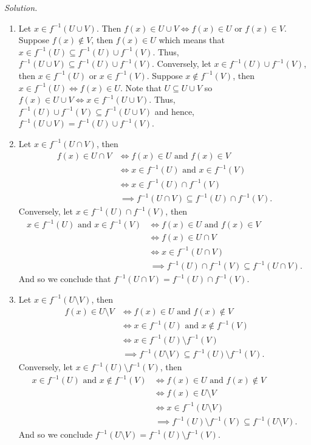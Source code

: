 \documentclass{amsart}
\theoremstyle{definition}
\begin{document}
\textit{Solution.} 
\begin{enumerate}
\item Let $x\in f^{-1}(U\cup V)$. Then $f(x)\in U\cup V \iff f(x)\in U$ or $f(x)\in V$. Suppose $f(x)\notin V$, then $f(x)\in U$ which means that $x\in f^{-1}(U)\subseteq f^{-1}(U)\cup f^{-1}(V)$. Thus, $f^{-1}(U\cup V)\subseteq f^{-1}(U)\cup f^{-1}(V)$. Conversely, let $x\in f^{-1}(U)\cup f^{-1}(V)$, then $x\in f^{-1}(U)$ or $x\in f^{-1}(V)$. Suppose $x\notin f^{-1}(V)$, then $x\in f^{-1}(U) \iff f(x)\in U$. Note that $U\subseteq U\cup V$ so $f(x)\in U\cup V\iff x\in f^{-1}(U\cup V)$. Thus, $f^{-1}(U)\cup f^{-1}(V)\subseteq f^{-1}(U\cup V)$ and hence, $f^{-1}(U\cup V)=f^{-1}(U)\cup f^{-1}(V)$. \\

\item Let $x\in f^{-1}(U\cap V)$, then
\begin{align*}
    f(x)\in U\cap V &\iff f(x)\in U \text{ and } f(x)\in V \\
    &\iff x\in f^{-1}(U) \text{ and } x\in f^{-1}(V) \\
    &\iff x\in f^{-1}(U)\cap f^{-1}(V) \\
    &\,\implies f^{-1}(U\cap V)\subseteq f^{-1}(U)\cap f^{-1}(V). 
\end{align*}
Conversely, let $x\in f^{-1}(U)\cap f^{-1}(V)$, then
\begin{align*}
    x\in f^{-1}(U) \text{ and } x\in f^{-1}(V) &\iff f(x)\in U \text{ and } f(x)\in V \\
    &\iff f(x)\in U\cap V \\
    &\iff x\in f^{-1}(U\cap V) \\
    &\,\implies f^{-1}(U)\cap f^{-1}(V)\subseteq f^{-1}(U\cap V).
\end{align*}
And so we conclude that $f^{-1}(U\cap V)=f^{-1}(U)\cap f^{-1}(V)$. \\

\item Let $x\in f^{-1}(U\setminus V)$, then
\begin{align*}
    f(x)\in U\setminus V &\iff f(x)\in U \text { and } f(x)\notin V \\
    &\iff x\in f^{-1}(U) \text{ and } x\notin f^{-1}(V) \\
    &\iff x\in f^{-1}(U)\setminus f^{-1}(V) \\
    &\,\implies f^{-1}(U\setminus V)\subseteq f^{-1}(U)\setminus f^{-1}(V). 
\end{align*}
Conversely, let $x\in f^{-1}(U)\setminus f^{-1}(V)$, then 
\begin{align*}
    x\in f^{-1}(U) \text{ and } x\notin f^{-1}(V) &\iff f(x)\in U \text{ and } f(x)\notin V \\
    &\iff f(x)\in U\setminus V \\
    &\iff x\in f^{-1}(U\setminus V) \\
    &\,\implies f^{-1}(U)\setminus f^{-1}(V)\subseteq f^{-1}(U\setminus V).
\end{align*}
And so we conclude $f^{-1}(U\setminus V)=f^{-1}(U)\setminus f^{-1}(V)$. \\
\end{enumerate}
\end{document}
